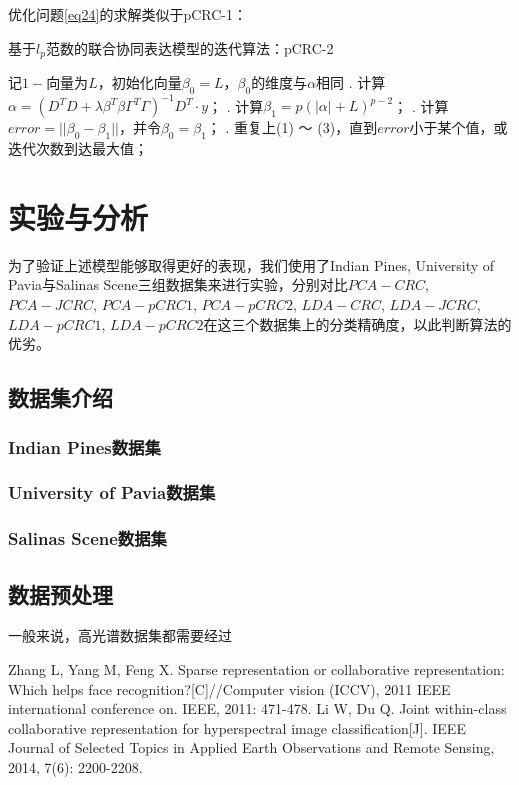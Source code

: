 \documentclass[12pt,a4paper]{article}
\begin{document}
优化问题\eqref{eq24}的求解类似于pCRC-1：
\begin{algorithm}[H] 
	\caption{基于$l_{p}$范数的联合协同表达模型的迭代算法：pCRC-2}  
	\label{alg:pCRC-2}  
	\begin{algorithmic}
		\STATE 记$1-$向量为$L$，初始化向量$\beta_{0} = L$，$\beta_{0}$的维度与$\alpha$相同
		. 计算$\alpha = (D^{T}D + \lambda \beta^{T}\beta\Gamma^{T}\Gamma)^{-1}D^{T} \cdot y$；   
		. 计算$\beta_{1} = p(|\alpha| + L)^{p - 2}$；
		. 计算$error = ||\beta_{0} - \beta_{1}||$，并令$\beta_{0} = \beta_{1}$；
		. 重复上(1) ～ (3)，直到$error$小于某个值，或迭代次数到达最大值；
	\end{algorithmic}  
\end{algorithm}  

\section{实验与分析}
为了验证上述模型能够取得更好的表现，我们使用了Indian Pines, University of Pavia与Salinas Scene三组数据集来进行实验，分别对比$PCA-CRC$, $PCA-JCRC$, $PCA-pCRC1$, $PCA-pCRC2$, $LDA-CRC$, $LDA-JCRC$, $LDA-pCRC1$, $LDA-pCRC2$在这三个数据集上的分类精确度，以此判断算法的优劣。

\subsection{数据集介绍}
\subsubsection{Indian Pines数据集}
\subsubsection{University of Pavia数据集}
\subsubsection{Salinas Scene数据集}

\subsection{数据预处理}
一般来说，高光谱数据集都需要经过


\begin{thebibliography}{}
 Zhang L, Yang M, Feng X. Sparse representation or collaborative representation: Which helps face recognition?[C]//Computer vision (ICCV), 2011 IEEE international conference on. IEEE, 2011: 471-478.
Li W, Du Q. Joint within-class collaborative representation for hyperspectral image classification[J]. IEEE Journal of Selected Topics in Applied Earth Observations and Remote Sensing, 2014, 7(6): 2200-2208.
\end{thebibliography}
\clearpage
\end{document}

